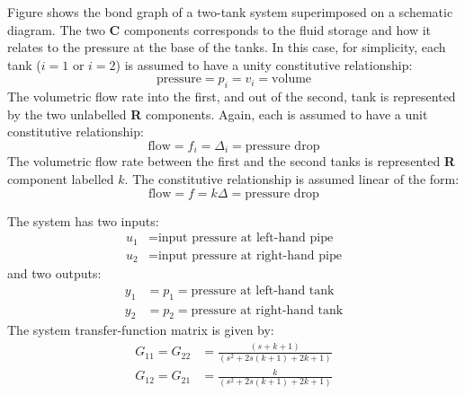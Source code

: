 

Figure  shows the bond graph of a two-tank system
superimposed on a schematic diagram. 
The two \textbf{C} components corresponds to the fluid storage and how
it relates to the pressure at the base of the tanks. In this case, for
simplicity, each tank ($i=1$ or $i=2$) is assumed to have a unity constitutive relationship:
\begin{equation}
  \text{pressure} = p_i = v_i = \text{volume}
\end{equation}
The volumetric flow rate into the first, and out of the second, tank
is represented by the two unlabelled \textbf{R} components. Again,
each is assumed to have a unit constitutive relationship:
\begin{equation}
  \text{flow} = f_i = \Delta_i = \text{pressure drop}
\end{equation}
The volumetric flow rate between the first and the second  tanks
is represented  \textbf{R} component labelled $k$. The constitutive relationship is assumed
linear of the form:
\begin{equation}
  \text{flow} = f = k \Delta  = \text{pressure drop}
\end{equation}

The system has two inputs:
\begin{equation}
  \begin{aligned}
    u_1 &= \text{input pressure at left-hand pipe} \\
    u_2 &= \text{input pressure at right-hand pipe} 
  \end{aligned}
\end{equation}
and two outputs:
\begin{equation}
  \begin{aligned}
    y_1 &= p_1 = \text{pressure at left-hand tank} \\
    y_2 &= p_2 = \text{pressure at right-hand tank} 
  \end{aligned}
\end{equation}
The system transfer-function matrix is given by:
\begin{equation}
  \begin{aligned}
G_{11} = G_{22} &= \frac{(s + k + 1)}{(s^2 + 2 s {(k + 1)} + 2 k + 1)}\\
G_{12} = G_{21} &= \frac{k}{(s^2 + 2 s {(k + 1)} + 2 k + 1)}
\end{aligned}
\end{equation}

